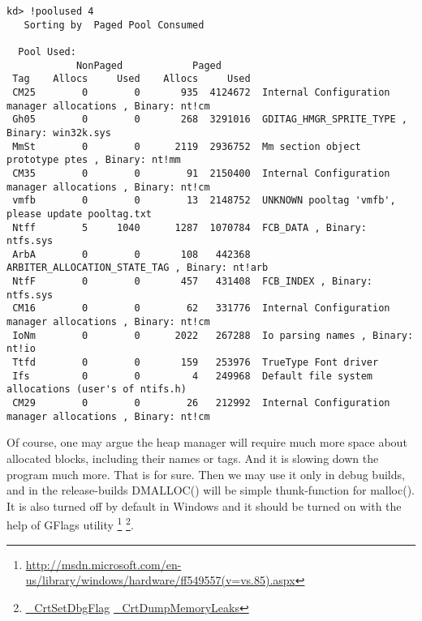 \begin{lstlisting}
kd> !poolused 4
   Sorting by  Paged Pool Consumed

  Pool Used:
            NonPaged            Paged
 Tag    Allocs     Used    Allocs     Used
 CM25        0        0       935  4124672	Internal Configuration manager allocations , Binary: nt!cm
 Gh05        0        0       268  3291016	GDITAG_HMGR_SPRITE_TYPE , Binary: win32k.sys
 MmSt        0        0      2119  2936752	Mm section object prototype ptes , Binary: nt!mm
 CM35        0        0        91  2150400	Internal Configuration manager allocations , Binary: nt!cm
 vmfb        0        0        13  2148752	UNKNOWN pooltag 'vmfb', please update pooltag.txt
 Ntff        5     1040      1287  1070784	FCB_DATA , Binary: ntfs.sys
 ArbA        0        0       108   442368	ARBITER_ALLOCATION_STATE_TAG , Binary: nt!arb
 NtfF        0        0       457   431408	FCB_INDEX , Binary: ntfs.sys
 CM16        0        0        62   331776	Internal Configuration manager allocations , Binary: nt!cm
 IoNm        0        0      2022   267288	Io parsing names , Binary: nt!io
 Ttfd        0        0       159   253976	TrueType Font driver 
 Ifs         0        0         4   249968	Default file system allocations (user's of ntifs.h) 
 CM29        0        0        26   212992	Internal Configuration manager allocations , Binary: nt!cm
\end{lstlisting}

{Of course, one may argue the heap manager will require much more space about allocated blocks,
including their names or tags}.
{And it is slowing down the program much more. That is for sure.}
{Then we may use it only in debug builds, and in the release-builds DMALLOC() will be
simple  thunk-function for} malloc().
{It is also turned off by default in Windows and it should be turned on with the help of GFlags utility}
\footnote{\url{http://msdn.microsoft.com/en-us/library/windows/hardware/ff549557(v=vs.85).aspx}}
\footnote{ 
\href{http://msdn.microsoft.com/en-us/library/5at7yxcs.aspx}{\_CrtSetDbgFlag}
\href{http://msdn.microsoft.com/en-us/library/d41t22sb.aspx}{\_CrtDumpMemoryLeaks}}.

